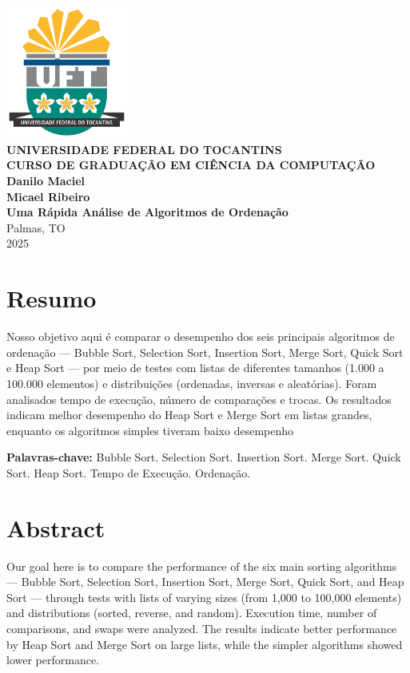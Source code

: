 \documentclass[12pt, a4paper]{report}
\begin{document}
\begin{titlepage}
    \centering
    \includegraphics[width=0.3\textwidth]{uft_logo.png}\\[1cm]
    \vspace{1cm}
    \textbf{\Large UNIVERSIDADE FEDERAL DO TOCANTINS}\\[0.5cm]
    \textbf{\large CURSO DE GRADUAÇÃO EM CIÊNCIA DA COMPUTAÇÃO}\\[2cm]
    
    \textbf{\large Danilo Maciel\\Micael Ribeiro}\\[2cm]
    
    \textbf{\LARGE Uma Rápida Análise de Algoritmos de Ordenação}\\[7cm]
    
    Palmas, TO\\
    2025
    
\end{titlepage}

\chapter*{Resumo}
Nosso objetivo aqui é comparar o desempenho dos seis principais algoritmos de ordenação — Bubble Sort, Selection Sort, Insertion Sort, Merge Sort, Quick Sort e Heap Sort — por meio de testes com listas de diferentes tamanhos (1.000 a 100.000 elementos) e distribuições (ordenadas, inversas e aleatórias). Foram analisados tempo de execução, número de comparações e trocas. Os resultados indicam melhor desempenho do Heap Sort e Merge Sort em listas grandes, enquanto os algoritmos simples tiveram baixo desempenho

\vspace{0.5cm}

\textbf{Palavras-chave:} Bubble Sort. Selection Sort. Insertion Sort. Merge Sort. Quick Sort.  Heap Sort. Tempo de Execução. Ordenação. 

\chapter*{Abstract}
Our goal here is to compare the performance of the six main sorting algorithms — Bubble Sort, Selection Sort, Insertion Sort, Merge Sort, Quick Sort, and Heap Sort — through tests with lists of varying sizes (from 1,000 to 100,000 elements) and distributions (sorted, reverse, and random). Execution time, number of comparisons, and swaps were analyzed. The results indicate better performance by Heap Sort and Merge Sort on large lists, while the simpler algorithms showed lower performance.
\end{document}
